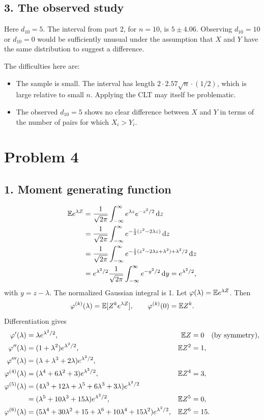 \documentclass[11pt,a4paper]{article}
\begin{document}
\subsection*{3. The observed study}
Here $d_{10}=5$. The interval from part 2, for $n=10$, is $5\pm4.06$. Observing $d_{10}=10$ or $d_{10}=0$ would be sufficiently unusual under the assumption that $X$ and $Y$ have the same distribution to suggest a difference.

The difficulties here are:
\begin{itemize}
\item The sample is small. The interval has length $2\cdot2.57\sqrt n\cdot(1/2)$, which is large relative to small $n$. Applying the CLT may itself be problematic.
\item The observed $d_{10}=5$ shows no clear difference between $X$ and $Y$ in terms of the number of pairs for which $X_i>Y_i$.
\end{itemize}

\section*{Problem 4}
\subsection*{1. Moment generating function}
\begin{align*}
\mathbb {E} e^{\lambda Z}
&=\frac1{\sqrt{2\pi}}\int_{-\infty}^\infty e^{\lambda z}e^{-z^2/2}\, \mathrm{d} z\\
&=\frac1{\sqrt{2\pi}}\int_{-\infty}^\infty e^{-\frac12(z^2-2\lambda z)}\, \mathrm{d} z\\
&=\frac1{\sqrt{2\pi}}\int_{-\infty}^\infty
e^{-\frac12(z^2-2\lambda z+\lambda^2)+\lambda^2/2}\, \mathrm{d} z\\
&=e^{\lambda^2/2}\frac1{\sqrt{2\pi}}\int_{-\infty}^\infty e^{-y^2/2}\, \mathrm{d} y
=e^{\lambda^2/2},
\end{align*}
with $y=z-\lambda$. The normalized Gaussian integral is 1.
Let $\varphi(\lambda)=\mathbb {E} e^{\lambda Z}$. Then
\[
\varphi^{(k)}(\lambda)=\mathbb {E}[Z^ke^{\lambda Z}],\qquad
\varphi^{(k)}(0)=\mathbb {E} Z^k.
\]
Differentiation gives
\begin{align*}
\varphi'(\lambda)&=\lambda e^{\lambda^2/2},&\mathbb {E} Z&=0\quad\text{(by symmetry)},\\
\varphi''(\lambda)&=(1+\lambda^2)e^{\lambda^2/2},&\mathbb {E} Z^2&=1,\\
\varphi'''(\lambda)&=(\lambda+\lambda^3+2\lambda)e^{\lambda^2/2},\\
\varphi^{(4)}(\lambda)&=(\lambda^4+6\lambda^2+3)e^{\lambda^2/2},&\mathbb {E} Z^4&=3,\\
\varphi^{(5)}(\lambda)&=(4\lambda^3+12\lambda+\lambda^5+6\lambda^3+3\lambda)e^{\lambda^2/2}\\
&=(\lambda^5+10\lambda^3+15\lambda)e^{\lambda^2/2},&\mathbb {E} Z^5&=0,\\
\varphi^{(6)}(\lambda)&=(5\lambda^4+30\lambda^2+15+\lambda^6+10\lambda^4+15\lambda^2)e^{\lambda^2/2},
&\mathbb {E} Z^6&=15.
\end{align*}
\end{document}
